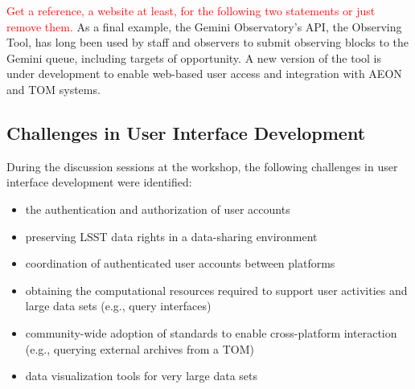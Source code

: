 \textcolor{red}{Get a reference, a website at least, for the following two statements or just remove them.}
As a final example, the Gemini Observatory's \gls{API}, the Observing Tool, has long been used by staff and observers to submit observing blocks to the Gemini queue, including targets of opportunity.
A new version of the tool is under development to enable web-based user access and integration with \gls{AEON} and \gls{TOM} systems.

\subsection{Challenges in User Interface Development}\label{ssec:interfaces_challenges}

During the discussion sessions at the workshop, the following challenges in user interface development were identified:
\begin{itemize}
\item the authentication and authorization of user accounts
\item preserving \gls{LSST} data rights in a data-sharing environment 
\item coordination of authenticated user accounts between platforms
\item obtaining the computational resources required to support user activities and large data sets (e.g., query interfaces)
\item community-wide adoption of standards to enable cross-platform interaction (e.g., querying external archives from a \gls{TOM})
\item data visualization tools for very large data sets
\end{itemize}


